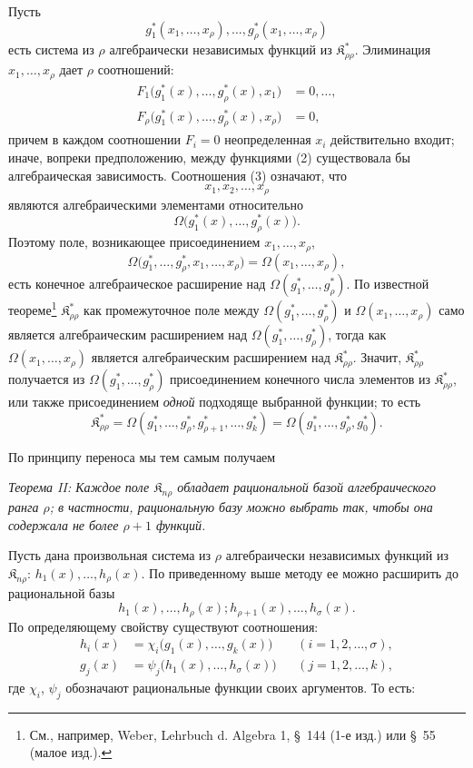 \documentclass[11pt]{article}
\providecommand{\Kfield}{\mathfrak{K}}
\begin{document}
Пусть
\begin{equation}
  g_1^*(x_1,\ldots,x_\rho),\ldots,
  g_\rho^*(x_1,\ldots,x_\rho)
\tag{2}
\end{equation}
есть система из $\rho$ алгебраически независимых функций из $\Kfield^*_{\rho\rho}$. Элиминация $x_1,\ldots,x_\rho$ дает $\rho$ соотношений:
\begin{equation}
\begin{aligned}
  F_1\bigl(g_1^*(x),\ldots,g_\rho^*(x),x_1\bigr)&=0,\ldots,\\
  F_\rho\bigl(g_1^*(x),\ldots,g_\rho^*(x),x_\rho\bigr)&=0,
\end{aligned}
\tag{3}
\end{equation}
причем в каждом соотношении $F_i=0$ неопределенная $x_i$ действительно входит; иначе, вопреки предположению, между функциями (2) существовала бы алгебраическая зависимость. Соотношения (3) означают, что
\[
  x_1,x_2,\ldots,x_\rho
\]
являются алгебраическими элементами относительно
\[
  \Omega\bigl(g_1^*(x),\ldots,g_\rho^*(x)\bigr).
\]
Поэтому поле, возникающее присоединением $x_1,\ldots,x_\rho$,
\[
  \Omega\bigl(g_1^*,\ldots,g_\rho^*,x_1,
  \ldots,x_\rho\bigr)=\Omega(x_1,\ldots,x_\rho),
\]
есть конечное алгебраическое расширение над $\Omega(g_1^*,\ldots,g_\rho^*)$. По известной теореме\footnote{См., например, Weber, Lehrbuch d. Algebra 1, \S\ 144 (1-е изд.) или \S\ 55 (малое изд.).} $\Kfield^*_{\rho\rho}$ как промежуточное поле между $\Omega(g_1^*,\ldots,g_\rho^*)$ и $\Omega(x_1,
\ldots,x_\rho)$ само является алгебраическим расширением над $\Omega(g_1^*,\ldots,g_\rho^*)$, тогда как $\Omega(x_1,
\ldots,x_\rho)$ является алгебраическим расширением над $\Kfield^*_{\rho\rho}$. Значит, $\Kfield^*_{\rho\rho}$ получается из $\Omega(g_1^*,\ldots,g_\rho^*)$ присоединением конечного числа элементов из $\Kfield^*_{\rho\rho}$, или также присоединением \emph{одной} подходяще выбранной функции; то есть
\[
  \Kfield^*_{\rho\rho}
  =\Omega(g_1^*,\ldots,g_\rho^*,g_{\rho+1}^*,\ldots,g_k^*)
  =\Omega(g_1^*,\ldots,g_\rho^*,g_0^*).
\]

По принципу переноса мы тем самым получаем

\emph{Теорема II: Каждое поле $\Kfield_{n\rho}$ обладает рациональной базой алгебраического ранга $\rho$; в частности, рациональную базу можно выбрать так, чтобы она содержала не более $\rho+1$ функций.}

Пусть дана произвольная система из $\rho$ алгебраически независимых функций из $\Kfield_{n\rho}$:
$h_1(x),\ldots,h_\rho(x)$. По приведенному выше методу ее можно расширить до рациональной базы
\[
  h_1(x),\ldots,h_\rho(x);
  h_{\rho+1}(x),\ldots,h_\sigma(x).
\]
По определяющему свойству существуют соотношения:
\[
\begin{aligned}
  h_i(x)&=\chi_i\bigl(g_1(x),\ldots,g_k(x)\bigr)
    &&(i=1,2,\ldots,\sigma),\\
  g_j(x)&=\psi_j\bigl(h_1(x),\ldots,h_\sigma(x)\bigr)
    &&(j=1,2,\ldots,k),
\end{aligned}
\]
где $\chi_i$, $\psi_j$ обозначают рациональные функции своих аргументов. То есть:
\end{document}
